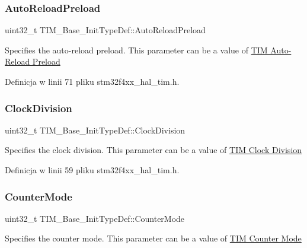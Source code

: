 \subsubsection{\texorpdfstring{Auto\+Reload\+Preload}{AutoReloadPreload}}
{\footnotesize\ttfamily uint32\+\_\+t T\+I\+M\+\_\+\+Base\+\_\+\+Init\+Type\+Def\+::\+Auto\+Reload\+Preload}

Specifies the auto-\/reload preload. This parameter can be a value of \hyperlink{group___t_i_m___auto_reload_preload}{T\+IM Auto-\/\+Reload Preload} 

Definicja w linii 71 pliku stm32f4xx\+\_\+hal\+\_\+tim.\+h.

\mbox{\label{struct_t_i_m___base___init_type_def_ade59c3a547a5409da845592f30596d17}} 
\subsubsection{\texorpdfstring{Clock\+Division}{ClockDivision}}
{\footnotesize\ttfamily uint32\+\_\+t T\+I\+M\+\_\+\+Base\+\_\+\+Init\+Type\+Def\+::\+Clock\+Division}

Specifies the clock division. This parameter can be a value of \hyperlink{group___t_i_m___clock_division}{T\+IM Clock Division} 

Definicja w linii 59 pliku stm32f4xx\+\_\+hal\+\_\+tim.\+h.

\mbox{\label{struct_t_i_m___base___init_type_def_a16d0c02a8f35426360a64c0706656e35}} 
\subsubsection{\texorpdfstring{Counter\+Mode}{CounterMode}}
{\footnotesize\ttfamily uint32\+\_\+t T\+I\+M\+\_\+\+Base\+\_\+\+Init\+Type\+Def\+::\+Counter\+Mode}

Specifies the counter mode. This parameter can be a value of \hyperlink{group___t_i_m___counter___mode}{T\+IM Counter Mode} 

